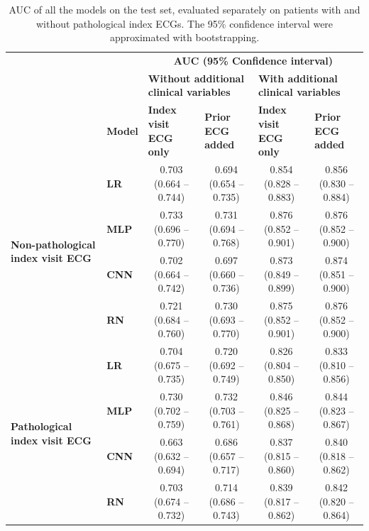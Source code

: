 \documentclass[preprint]{elsarticle}
\begin{document}
\renewcommand{\arraystretch}{1.2}
\begin{table}[H]
  \centering
  \scriptsize
\begin{adjustbox}{center}
\begin{tabular}{@{}llcccc@{}}
  \toprule
  & & \multicolumn{4}{c}{\textbf{AUC (95\% Confidence interval)}} \\
  \cmidrule(lr){3-6}
  & & \multicolumn{2}{l}{\textbf{Without additional clinical variables}} & \multicolumn{2}{l}{\textbf{With additional clinical variables}} \\
  \cmidrule(lr){3-4}\cmidrule(lr){5-6}
  & \multicolumn{1}{l}{\textbf{Model}} & \multicolumn{1}{l}{\textbf{Index visit ECG only}} & \multicolumn{1}{l}{\textbf{Prior ECG added}} & \multicolumn{1}{l}{\textbf{Index visit ECG only}} & \multicolumn{1}{l}{\textbf{Prior ECG added}} \\
  \midrule

\multirow{4}{*}{\begin{minipage}{0.65in}\textbf{Non-pathological index visit ECG}\end{minipage}} %
& \textbf{LR}  & 0.703 (0.664 -- 0.744) & 0.694 (0.654 -- 0.735) & 0.854 (0.828 -- 0.883) & 0.856 (0.830 -- 0.884) \\
& \textbf{MLP} & 0.733 (0.696 -- 0.770) & 0.731 (0.694 -- 0.768) & 0.876 (0.852 -- 0.901) & 0.876 (0.852 -- 0.900) \\
& \textbf{CNN} & 0.702 (0.664 -- 0.742) & 0.697 (0.660 -- 0.736) & 0.873 (0.849 -- 0.899) & 0.874 (0.851 -- 0.900) \\
& \textbf{RN}  & 0.721 (0.684 -- 0.760) & 0.730 (0.693 -- 0.770) & 0.875 (0.852 -- 0.901) & 0.876 (0.852 -- 0.900) \\
  \cmidrule(lr){1-2}
\multirow{4}{*}{\begin{minipage}{0.65in}\textbf{Pathological index visit ECG}\end{minipage}} %
& \textbf{LR}  & 0.704 (0.675 -- 0.735) & 0.720 (0.692 -- 0.749) & 0.826 (0.804 -- 0.850) & 0.833 (0.810 -- 0.856) \\
& \textbf{MLP} & 0.730 (0.702 -- 0.759) & 0.732 (0.703 -- 0.761) & 0.846 (0.825 -- 0.868) & 0.844 (0.823 -- 0.867) \\
& \textbf{CNN} & 0.663 (0.632 -- 0.694) & 0.686 (0.657 -- 0.717) & 0.837 (0.815 -- 0.860) & 0.840 (0.818 -- 0.862) \\
& \textbf{RN}  & 0.703 (0.674 -- 0.732) & 0.714 (0.686 -- 0.743) & 0.839 (0.817 -- 0.862) & 0.842 (0.820 -- 0.864) \\

\bottomrule
\end{tabular}
\end{adjustbox}
\caption{AUC of all the models on the test set, evaluated separately on patients with and without pathological index ECGs. The 95\% confidence interval were approximated with bootstrapping.}
\label{table:appendix:pathological}
\end{table}
\renewcommand{\arraystretch}{1}
\end{document}
